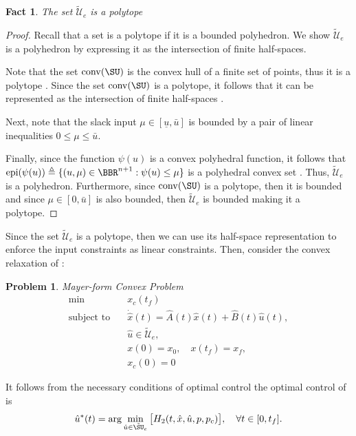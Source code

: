 \documentclass[conf]{new-aiaa}
\newtheorem{fact}{Fact}
\newtheorem{problem}{Problem}
\begin{document}
\begin{fact}\label{fact:augmented_set_polytope}
The set $\tilde{\mathcal{U}}_e$ is a polytope
\end{fact}

\begin{proof}
Recall that a set is a polytope if it is a bounded polyhedron. We show $\tilde{\mathcal{U}}_e$ is a polyhedron by expressing it as the intersection of finite half-spaces.

Note that the set $\mathrm{conv}(\SU)$ is the convex hull of a finite set of points, thus it is a polytope \cite[Theorem 18.5]{rockafellar_convex_2015}. Since the set $\mathrm{conv}(\SU)$ is a polytope, it follows that it can be represented as the intersection of finite half-spaces \cite[Theorem 1.1]{ziegler_lectures_2007}.

Next, note that the slack input $\mu \in [\underline{u}, \bar{u}]$ is bounded by a pair of linear inequalities $0 \leq \mu \leq \bar{u}$.

Finally, since the function $\psi(u)$ is a convex polyhedral function, it follows that  $\mathrm{epi}(\psi(u)) \triangleq \{(u,\mu) \in \BBR^{n+1}: \psi(u) \leq \mu\}$ is a polyhedral convex set \cite[Corollary 19.2.1]{rockafellar_convex_2015}. Thus, $\tilde{\mathcal{U}}_e$ is a polyhedron. Furthermore, since $\mathrm{conv}(\SU)$ is a polytope, then it is bounded and since $\mu \in [0, \bar{u}]$ is also bounded, then $\tilde{\mathcal{U}}_e$ is bounded making it a polytope.
\end{proof}

Since the set $\tilde{\mathcal{U}}_e$ is a polytope, then we can use its half-space representation to enforce the input constraints as linear constraints. Then, consider the convex relaxation of :
%
\begin{problem}\rm{Mayer-form Convex Problem}\label{prob:CP_Mayer}
    \begin{subequations}
        \begin{align}
            \min \quad & x_c(t_f)\\
            \text{subject to} \quad 
            & \dot{\hat{x}}(t) = \hat{A}(t) \hat{x}(t) + \hat{B}(t) \hat{u}(t), \label{eq:Prob_Aug_Dynamics}\\
            & \hat{u} \in \tilde{\mathcal{U}}_e,\\
            & x(0) = x_0, \quad x(t_f) = x_f, \\
            & x_c(0) = 0
        \end{align}
    \end{subequations}
\end{problem}
%
It follows from the necessary conditions of optimal control \cite[Theorem 6.7.1]{berkovitz_nonlinear_2013} the optimal control of  is 
%
\begin{equation}\label{eq:optimal_control_p3}
    \hat u^*(t) = \arg \min_{\hat u \in \tilde{\SU}_e} \big[ H_2(t,\hat x,\hat u,p, p_c) \big], \quad \forall t \in [0,t_f].
\end{equation}
\end{document}
